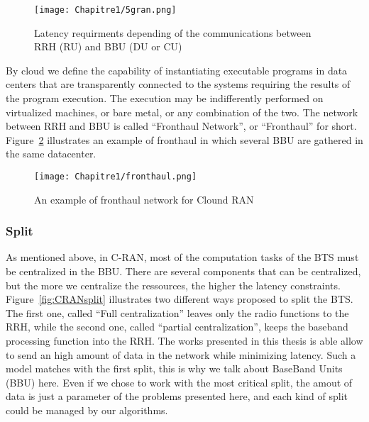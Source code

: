  \begin{figure}[h]
      \begin{center}
      \texttt{[image: Chapitre1/5gran.png]}
      \end{center}
      \caption{Latency requirments depending of the communications between RRH (RU) and BBU (DU or CU) }\label{fig:5gran}
      \end{figure}

By cloud we define the capability of instantiating executable programs in data centers that are transparently connected to the systems requiring the results of the program execution.
 The execution may be indifferently performed on virtualized machines, or bare metal, or any combination of the two. The network between RRH and BBU is called “Fronthaul Network”, or “Fronthaul” for short. Figure~\ref{fig:fronthaul} illustrates an example of fronthaul in which several BBU are gathered in the same datacenter. 

  \begin{figure}[h]
      \begin{center}
      \texttt{[image: Chapitre1/fronthaul.png]}
      \end{center}
      \caption{An example of fronthaul network for Clound RAN}\label{fig:fronthaul}
      \end{figure}
      
      \subsubsection{Split}

      As mentioned above, in C-RAN, most of the computation tasks of the BTS must be centralized in the BBU. There are several components that can be centralized, but the more we centralize the ressources, the higher the latency constraints.
      Figure~\ref{fig:CRANsplit} illustrates two different ways proposed to split the BTS. The first one, called ``Full centralization'' leaves only the radio functions to the RRH, while the second one, called ``partial centralization'', keeps the baseband processing function into the RRH. The works presented in this thesis is able allow to send an high amount of data in the network while minimizing latency. Such a model matches with the first split, this is why we talk about BaseBand Units (BBU) here. 
      Even if we chose to work with the most critical split, the amout of data is just a parameter of the problems presented here, and each kind of split could be managed by our algorithms.
      
